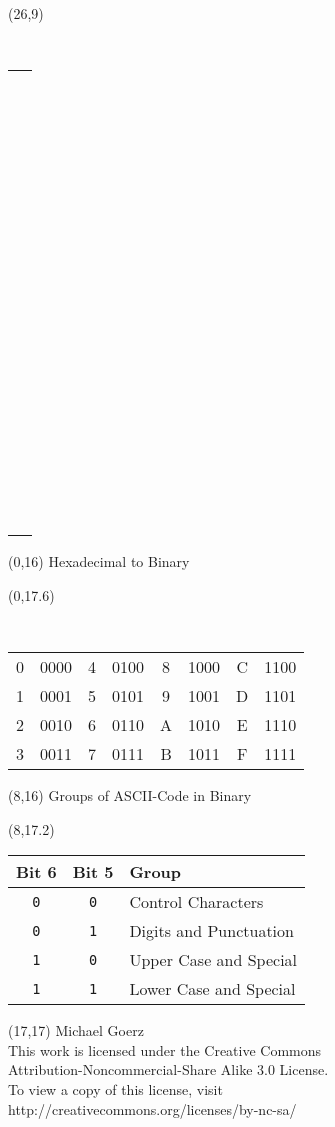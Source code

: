 \documentclass[a4paper, landscape, 10pt]{article} %
\begin{document}
\begin{textblock}{3}(26,9)
{\tt
  \begin{tabular*}{\textwidth}{|c}
    ~ \\ ~ \\ ~ \\ ~ \\ ~ \\ ~ \\ ~ \\ ~ \\
    ~ \\ ~ \\ ~ \\ ~ \\ ~ \\ ~ \\ ~ \\ ~
  \end{tabular*}
}
\end{textblock}




\begin{textblock}{6}(0,16)
  \center
   Hexadecimal to Binary
\end{textblock}
\begin{textblock}{6}(0,17.6)
{\tt
    \begin{tabular}{|cc|cc||cc|cc|}
      \hline
      0 & 0000 & 4 & 0100 & 8 & 1000 & C & 1100 \\
      1 & 0001 & 5 & 0101 & 9 & 1001 & D & 1101 \\
      2 & 0010 & 6 & 0110 & A & 1010 & E & 1110 \\
      3 & 0011 & 7 & 0111 & B & 1011 & F & 1111 \\
      \hline
    \end{tabular}
}
\end{textblock}


\begin{textblock}{6}(8,16)
  \center
   Groups of ASCII-Code in Binary
\end{textblock}
\begin{textblock}{6}(8,17.2)
{
  \begin{tabular}{|c|c|l|}
    \hline
    Bit 6       & Bit 5       & Group \\
    \hline
    {\tt 0}     & {\tt 0}     & Control Characters     \\
    {\tt 0}     & {\tt 1}     & Digits and Punctuation \\
    {\tt 1}     & {\tt 0}     & Upper Case and Special \\
    {\tt 1}     & {\tt 1}     & Lower Case and Special \\
    \hline
  \end{tabular}
}
\end{textblock}

\begin{textblock}{8}(17,17)
   Michael Goerz \\
  { \small
  This work is licensed under the Creative Commons \\
  Attribution-Noncommercial-Share Alike 3.0 License.\\
  To view a copy of this license, visit\\
  http://creativecommons.org/licenses/by-nc-sa/
  }
\end{textblock}
\end{document}
